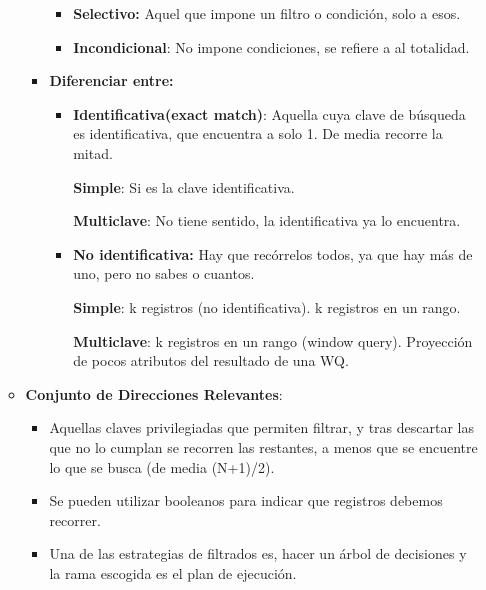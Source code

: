 \documentclass[12pt, twoside, openright]{report} %
\begin{document}
\begin{itemize}
\begin{itemize}
\begin{itemize}
          \begin{itemize}
          \item \textbf{Selectivo:} Aquel que impone un filtro o condición,
            solo a esos.
            
          \item \textbf{Incondicional}: No impone condiciones, se refiere a
            al totalidad.
            
          \end{itemize}
        \item \textbf{Diferenciar entre:}
          

          \begin{itemize}
          \item \textbf{Identificativa(exact match)}: Aquella cuya clave de
            búsqueda es identificativa, que encuentra a solo 1. De media
            recorre la mitad.
            

            
			
              \textbf{Simple}: Si es la clave identificativa.
              
			  
              \textbf{Multiclave}: No tiene sentido, la identificativa
              ya lo encuentra.
             
          \item \textbf{No identificativa:} Hay que recórrelos todos, ya que
            hay más de uno, pero no sabes o cuantos.
            
			
              \textbf{Simple}: k registros (no identificativa). k
              registros en un rango.
             			  
              \textbf{Multiclave}: k registros en un rango (window
              query). Proyección de pocos atributos del resultado de una
              WQ.
            
			  
          \end{itemize}
        \end{itemize}
      \item \textbf{Conjunto de Direcciones Relevantes}:
        

        \begin{itemize}
        \item Aquellas claves privilegiadas que permiten filtrar, y tras
          descartar las que no lo cumplan se recorren las restantes, a
          menos que se encuentre lo que se busca (de media (N+1)/2).
          
        \item Se pueden utilizar booleanos para indicar que registros
          debemos recorrer.
          
        \item Una de las estrategias de filtrados es, hacer un árbol de
          decisiones y la rama escogida es el plan de ejecución.
          
        \end{itemize}
      \end{itemize}
    \end{itemize}
\end{document}
